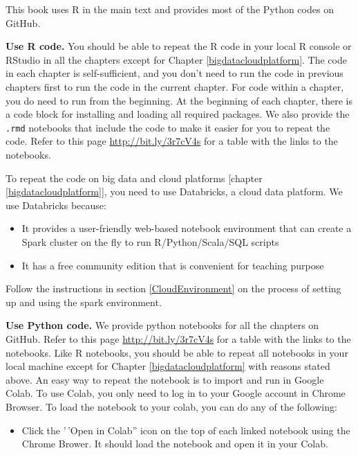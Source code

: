 \documentclass[
  12pt,
]{krantz}
\providecommand{\tightlist}{%
  \setlength{\itemsep}{0pt}\setlength{\parskip}{0pt}}
\begin{document}
This book uses R in the main text and provides most of the Python codes on GitHub.

\textbf{Use R code.} You should be able to repeat the R code in your local R console or RStudio in all the chapters except for Chapter \ref{bigdatacloudplatform}. The code in each chapter is self-sufficient, and you don't need to run the code in previous chapters first to run the code in the current chapter. For code within a chapter, you do need to run from the beginning. At the beginning of each chapter, there is a code block for installing and loading all required packages. We also provide the \texttt{.rmd} notebooks that include the code to make it easier for you to repeat the code. Refer to this page \url{http://bit.ly/3r7cV4s} for a table with the links to the notebooks.

To repeat the code on big data and cloud platforms {[}chapter \ref{bigdatacloudplatform}{]}, you need to use Databricks, a cloud data platform. We use Databricks because:

\begin{itemize}
\tightlist
\item
  It provides a user-friendly web-based notebook environment that can create a Spark cluster on the fly to run R/Python/Scala/SQL scripts
\item
  It has a free community edition that is convenient for teaching purpose
\end{itemize}

Follow the instructions in section \ref{CloudEnvironment} on the process of setting up and using the spark environment.

\textbf{Use Python code.} We provide python notebooks for all the chapters on GitHub. Refer to this page \url{http://bit.ly/3r7cV4s} for a table with the links to the notebooks. Like R notebooks, you should be able to repeat all notebooks in your local machine except for Chapter \ref{bigdatacloudplatform} with reasons stated above. An easy way to repeat the notebook is to import and run in Google Colab. To use Colab, you only need to log in to your Google account in Chrome Browser. To load the notebook to your colab, you can do any of the following:

\begin{itemize}
\tightlist
\item
  Click the '\,'Open in Colab'' icon on the top of each linked notebook using the Chrome Brower. It should load the notebook and open it in your Colab.
\end{itemize}
\end{document}
